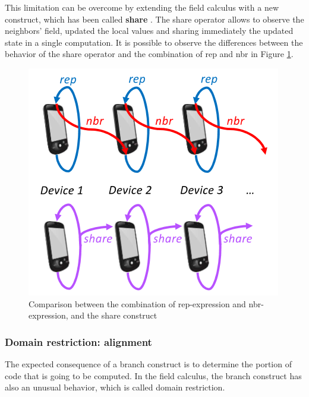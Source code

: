 This limitation can be overcome by extending the field calculus with a new construct, which has been called \textbf{share} \cite{share_operator}. The share operator allows to observe the neighbors' field, updated the local values and sharing immediately the updated state in a single computation. It is possible to observe the differences between the behavior of the share operator and the combination of rep and nbr in Figure \ref{fig:share_operator_introduction}.

\begin{figure}[!ht]
    \centering
    \includegraphics[scale=0.8]{document/chapters/1-introduction/images/share_operator_introduction.png}
    \caption{Comparison between the combination of rep-expression and nbr-expression, and the share construct \cite{share_operator}}
    \label{fig:share_operator_introduction}
\end{figure}

\subsubsection{Domain restriction: alignment}\label{section:alignment}
The expected consequence of a branch construct is to determine the portion of code that is going to be computed. In the field calculus, the branch construct has also an unusual behavior, which is called domain restriction.

